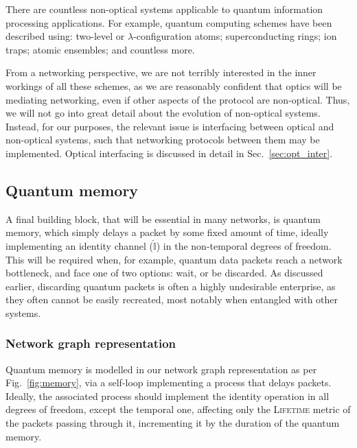 There are countless non-optical systems applicable to quantum information processing applications. For example, quantum computing schemes have been described using: two-level or $\lambda$-configuration atoms; superconducting rings; ion traps; atomic ensembles; and countless more.


From a networking perspective, we are not terribly interested in the inner workings of all these schemes, as we are reasonably confident that optics will be mediating networking, even if other aspects of the protocol are non-optical. Thus, we will not go into great detail about the evolution of non-optical systems. Instead, for our purposes, the relevant issue is interfacing between optical and non-optical systems, such that networking protocols between them may be implemented. Optical interfacing is discussed in detail in Sec.~\ref{sec:opt_inter}.

%
%

\subsection{Quantum memory} \label{sec:memory} 


A final building block, that will be essential in many networks, is quantum memory, which simply delays a packet by some fixed amount of time, ideally implementing an identity channel ($\hat{\mathbb{I}}$) in the non-temporal degrees of freedom. This will be required when, for example, quantum data packets reach a network bottleneck, and face one of two options: wait, or be discarded. As discussed earlier, discarding quantum packets is often a highly undesirable enterprise, as they often cannot be easily recreated, most notably when entangled with other systems.

%
%

\subsubsection{Network graph representation}

Quantum memory is modelled in our network graph representation as per Fig.~\ref{fig:memory}, via a self-loop implementing a process that delays packets. Ideally, the associated process should implement the identity operation in all degrees of freedom, except the temporal one, affecting only the \textsc{Lifetime} metric of the packets passing through it, incrementing it by the duration of the quantum memory.

